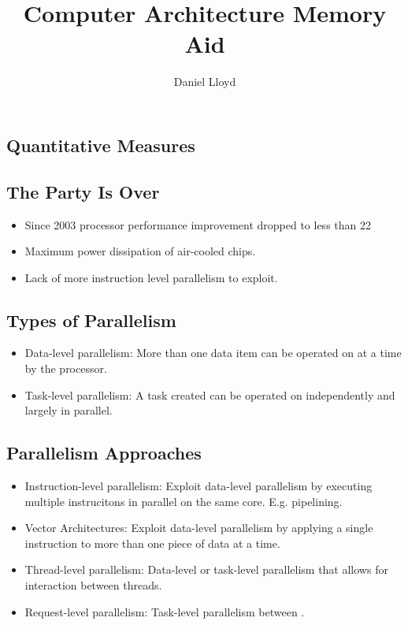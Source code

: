 \documentclass[8pt]{extarticle}
\title{Computer Architecture Memory Aid}
\author{Daniel Lloyd}
\begin{document}
\maketitle 

\begin{multicols}{3}

\section{Quantitative Measures}

\subsection{The Party Is Over}

\begin{itemize}
  \item Since 2003 processor performance improvement dropped to less
    than 22%
  \item Maximum power dissipation of air-cooled chips.
  \item Lack of more instruction level parallelism to exploit.
\end{itemize}

\subsection{Types of Parallelism}
\begin{itemize}
  \item Data-level parallelism: More than one data item can be operated on at a
    time by the processor.
  \item Task-level parallelism: A task created can be operated on independently
    and largely in parallel.
\end{itemize}

\subsection{Parallelism Approaches}
\begin{itemize}
  \item Instruction-level parallelism: Exploit data-level parallelism by
    executing multiple instrucitons in parallel on the same core.
    E.g. pipelining.
  \item Vector Architectures: Exploit data-level parallelism by applying a
    single instruction to more than one piece of data at a time.
  \item Thread-level parallelism: Data-level or task-level parallelism
    that allows for interaction between threads.
  \item Request-level parallelism: Task-level parallelism between .
\end{itemize}


\end{multicols}
\end{document}
